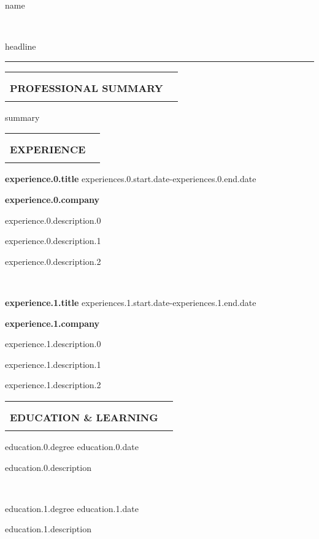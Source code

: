 \documentclass{article}
\makeatletter
\newcommand{\cvsection}[1]{
\setlength{\arrayrulewidth}{2pt}
\begin{tabular}{@{}ll}
& \\
& \\
\textbf{\Large #1} & \\[3pt]
\hline
& \\
\end{tabular}
}
\newcommand*{\ClipSep}{0.4cm}
\makeatother
\begin{document}
\pagestyle{empty}

\begin{paracol}{2}

\begin{minipage}{0.7\linewidth}
{\LARGE name} 

~

{\Large headline}

\end{minipage} \hfill
\begin{minipage}{0.18\linewidth}
\end{minipage}

\rule{1.2\linewidth}{0.4pt}

\cvsection{PROFESSIONAL SUMMARY}

{summary}

\cvsection{EXPERIENCE}

\textbf{{experience.0.title}} \hfill {experiences.0.start.date}-{experiences.0.end.date}

\textbf{{experience.0.company}}

{experience.0.description.0}

{experience.0.description.1}

{experience.0.description.2}

~

\textbf{{experience.1.title}} \hfill {experiences.1.start.date}-{experiences.1.end.date}

\textbf{{experience.1.company}}

{experience.1.description.0}

{experience.1.description.1}

{experience.1.description.2}

\cvsection{EDUCATION \& LEARNING}

{education.0.degree} \hfill {education.0.date}

{education.0.description}

~

{education.1.degree} \hfill {education.1.date}

{education.1.description}


\end{paracol}
\end{document}
